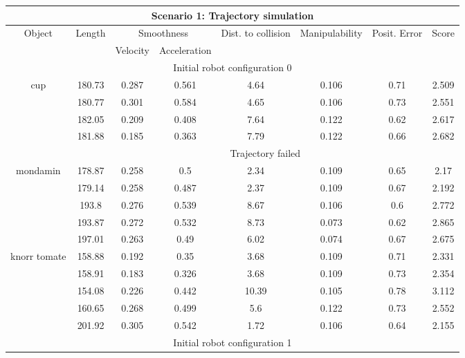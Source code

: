 {\small
\begin{center}
\begin{longtable}[c]{ | c | c | c | c | c | c | c || c || }
\hline
\hline
\multicolumn{8}{|c|}{Scenario 1: Trajectory simulation} \\
\hline
\hline
\multirow{2}{*}{Object} & \multirow{2}{*}{Length} & \multicolumn{2}{c|}{Smoothness} & \multirow{2}{1.5cm}{Dist. to collision} &\multirow{2}{*}{Manipulability} & \multirow{2}{1.3cm}{Posit. Error} & \multirow{2}{*}{Score}\\
& & Velocity & Acceleration & & & &\\
\hline
\endhead
\multicolumn{8}{|c|}{Initial robot configuration 0} \\
\hline
\multirow{5}{1.5cm}{cup}& 180.73 & 0.287 & 0.561 & 4.64 & 0.106 & 0.71 & 2.509 \\
& 180.77 & 0.301 & 0.584 & 4.65 & 0.106 & 0.73 & 2.551 \\ 
& 182.05 & 0.209 & 0.408 & 7.64 & 0.122 & 0.62 & 2.617 \\ 
& 181.88 & 0.185 & 0.363 & 7.79 & 0.122 & 0.66 & 2.682 \\ 
& \multicolumn{7}{c|}{Trajectory failed} \\ 
\hline 
\multirow{5}{1.5cm}{mondamin}& 178.87 & 0.258 & 0.5 & 2.34 & 0.109 & 0.65 & 2.17 \\
& 179.14 & 0.258 & 0.487 & 2.37 & 0.109 & 0.67 & 2.192 \\
& 193.8 & 0.276 & 0.539 & 8.67 & 0.106 & 0.6 & 2.772 \\
& 193.87 & 0.272 & 0.532 & 8.73 & 0.073 & 0.62 & 2.865 \\
& 197.01 & 0.263 & 0.49 & 6.02 & 0.074 & 0.67 & 2.675 \\
\hline 
\multirow{5}{1.5cm}{knorr tomate}& 158.88 & 0.192 & 0.35 & 3.68 & 0.109 & 0.71 & 2.331 \\
& 158.91 & 0.183 & 0.326 & 3.68 & 0.109 & 0.73 & 2.354 \\
& 154.08 & 0.226 & 0.442 & 10.39 & 0.105 & 0.78 & 3.112 \\
& 160.65 & 0.268 & 0.499 & 5.6 & 0.122 & 0.73 & 2.552 \\
& 201.92 & 0.305 & 0.542 & 1.72 & 0.106 & 0.64 & 2.155 \\
\hline 
\multicolumn{8}{|c|}{Initial robot configuration 1} \\

\end{longtable}
\end{center}}

